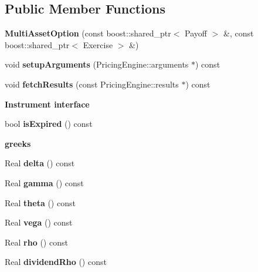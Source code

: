 \subsection*{Public Member Functions}
\begin{DoxyCompactItemize}
\item 
{\bfseries Multi\+Asset\+Option} (const boost\+::shared\+\_\+ptr$<$ Payoff $>$ \&, const boost\+::shared\+\_\+ptr$<$ Exercise $>$ \&)\label{class_quant_lib_1_1_multi_asset_option_a4b9ceec9c56187bad49eb9a74ac2363b}

\item 
void {\bfseries setup\+Arguments} (Pricing\+Engine\+::arguments $\ast$) const \label{class_quant_lib_1_1_multi_asset_option_a359dbefaf43322b3052ea9d2e4f27004}

\item 
void {\bfseries fetch\+Results} (const Pricing\+Engine\+::results $\ast$) const \label{class_quant_lib_1_1_multi_asset_option_ab8074f4c625e2ba76702c394a65efc1d}

\end{DoxyCompactItemize}
\begin{Indent}{\bf Instrument interface}\par
\begin{DoxyCompactItemize}
\item 
bool {\bfseries is\+Expired} () const \label{class_quant_lib_1_1_multi_asset_option_a505c4359d6ae814658968a11812f1aa1}

\end{DoxyCompactItemize}
\end{Indent}
\begin{Indent}{\bf greeks}\par
\begin{DoxyCompactItemize}
\item 
Real {\bfseries delta} () const \label{class_quant_lib_1_1_multi_asset_option_a9ccec9e50e39f277a0453ae1c2c07704}

\item 
Real {\bfseries gamma} () const \label{class_quant_lib_1_1_multi_asset_option_ac122bdbb41e15999adddb8039c20d10f}

\item 
Real {\bfseries theta} () const \label{class_quant_lib_1_1_multi_asset_option_a227640581bd0ecb00a222b8dda5ecf74}

\item 
Real {\bfseries vega} () const \label{class_quant_lib_1_1_multi_asset_option_a0a65428f86ee22c4813d06a8253e8d11}

\item 
Real {\bfseries rho} () const \label{class_quant_lib_1_1_multi_asset_option_a612bc02bf9286becc4ef2f42b1b53259}

\item 
Real {\bfseries dividend\+Rho} () const \label{class_quant_lib_1_1_multi_asset_option_ad7cfef508be9725905a425fc9e1713ea}

\end{DoxyCompactItemize}
\end{Indent}
